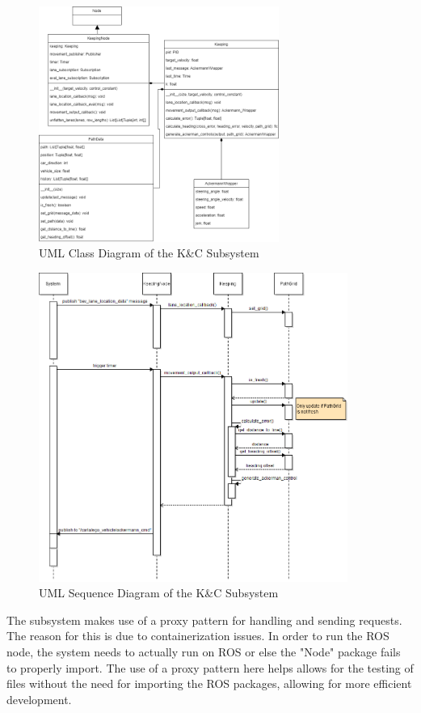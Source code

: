 \documentclass[titlepage]{article}
\begin{document}
{\begin{figure}
	\centering
	\includegraphics[width=0.7\textwidth]{KnC_diagrams}
	\caption{UML Class Diagram of the K\&C Subsystem}
	\label{fig:control_class}
\end{figure}

\begin{figure}
	\centering
	\includegraphics[width=0.9\textwidth]{KnC_sequence.png}
	\caption{UML Sequence Diagram of the K\&C Subsystem}
	\label{fig:control_sequence}
\end{figure}

The subsystem makes use of a proxy pattern for handling and sending requests. The reason for this is due to containerization issues. In order to run the ROS node, the system needs to actually run on ROS or else the "Node" package fails to properly import. The use of a proxy pattern here helps allows for the testing of files without the need for importing the ROS packages, allowing for more efficient development.


}
\end{document}
